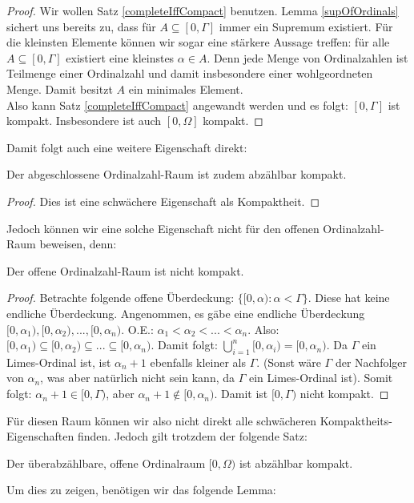 \documentclass[11pt]{scrartcl}
\begin{document}
\begin{proof}
	Wir wollen Satz \ref{completeIffCompact} benutzen. Lemma \ref{supOfOrdinals} sichert uns bereits zu, dass für $A\subseteq [0,\Gamma]$ immer ein Supremum existiert. Für die kleinsten Elemente können wir sogar eine stärkere Aussage treffen:
	für alle $A\subseteq [0,\Gamma]$ existiert eine kleinstes $\alpha \in A$. Denn jede Menge von
	Ordinalzahlen ist Teilmenge einer Ordinalzahl und damit insbesondere einer wohlgeordneten Menge. Damit besitzt $A$ ein minimales Element.\\
	Also kann Satz \ref{completeIffCompact} angewandt werden und es folgt: $[0,\Gamma]$ ist kompakt. Insbesondere ist auch $[0,\Omega]$ kompakt.
\end{proof}
Damit folgt auch eine weitere Eigenschaft direkt:
\begin{corollary}
	Der abgeschlossene Ordinalzahl-Raum ist zudem abzählbar kompakt.
\end{corollary}
\begin{proof}
	Dies ist eine schwächere Eigenschaft als Kompaktheit.
\end{proof}
Jedoch können wir eine solche Eigenschaft nicht für den offenen Ordinalzahl-Raum beweisen, denn:
\begin{theorem}
	Der offene Ordinalzahl-Raum ist nicht kompakt.
\end{theorem}
\begin{proof}
	Betrachte folgende offene Überdeckung: $\{[0,\alpha): \alpha <\Gamma\}$. Diese hat keine endliche Überdeckung.
	Angenommen, es gäbe eine endliche Überdeckung $[0,\alpha_1),[0,\alpha_2),...,[0,\alpha_n)$. O.E.: $\alpha_1 <\alpha_2 < ... < \alpha_n$. Also: $[0,\alpha_1)\subseteq [0,\alpha_2)\subseteq ... \subseteq [0,\alpha_n)$.
	Damit folgt: $\bigcup_{i=1}^n [0,\alpha_i)=[0,\alpha_n)$. Da $\Gamma$ ein Limes-Ordinal ist, 
	ist $\alpha_n+1$ ebenfalls kleiner als $\Gamma$. (Sonst wäre $\Gamma$ der Nachfolger von $\alpha_n$, was aber natürlich nicht sein kann, da $\Gamma$ ein Limes-Ordinal ist).
	Somit folgt: $\alpha_n+1 \in [0, \Gamma)$, aber $\alpha_n+1\notin [0,\alpha_n)$. Damit ist $[0,\Gamma)$ nicht kompakt.
\end{proof}
Für diesen Raum können wir also nicht direkt alle schwächeren Kompaktheits-Eigenschaften finden. Jedoch gilt trotzdem der folgende Satz:
\begin{theorem}\label{UOOSIsCC}
	Der überabzählbare, offene Ordinalraum $[0,\Omega)$ ist abzählbar kompakt.
\end{theorem}
Um dies zu zeigen, benötigen wir das folgende Lemma:
\end{document}
